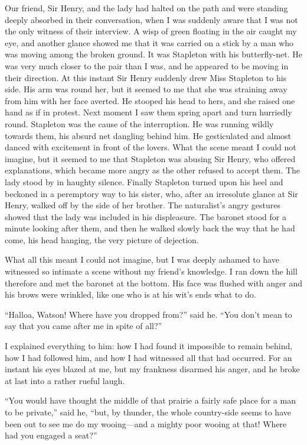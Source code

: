 \documentclass[paper=a5,BCOR=7mm,twoside,DIV=calc,12pt,usegeometry,openany,chapterprefix,endperiod,headings=big]{scrbook} %
\begin{document}
Our friend, Sir Henry, and the lady had halted on the path and were standing deeply absorbed in their conversation, when I was suddenly aware that I was not the only witness of their interview. A wisp of green floating in the air caught my eye, and another glance showed me that it was carried on a stick by a man who was moving among the broken ground. It was Stapleton with his butterfly-net. He was very much closer to the pair than I was, and he appeared to be moving in their direction. At this instant Sir Henry suddenly drew Miss Stapleton to his side. His arm was round her, but it seemed to me that she was straining away from him with her face averted. He stooped his head to hers, and she raised one hand as if in protest. Next moment I saw them spring apart and turn hurriedly round. Stapleton was the cause of the interruption. He was running wildly towards them, his absurd net dangling behind him. He gesticulated and almost danced with excitement in front of the lovers. What the scene meant I could not imagine, but it seemed to me that Stapleton was abusing Sir Henry, who offered explanations, which became more angry as the other refused to accept them. The lady stood by in haughty silence. Finally Stapleton turned upon his heel and beckoned in a peremptory way to his sister, who, after an irresolute glance at Sir Henry, walked off by the side of her brother. The naturalist's angry gestures showed that the lady was included in his displeasure. The baronet stood for a minute looking after them, and then he walked slowly back the way that he had come, his head hanging, the very picture of dejection.

What all this meant I could not imagine, but I was deeply a\-shamed to have witnessed so intimate a scene without my friend's knowledge. I ran down the hill therefore and met the baronet at the bottom. His face was flushed with anger and his brows were wrin\-kled, like one who is at his wit's ends what to do.

\enquote{Halloa, Watson! Where have you dropped from?} said he. \enquote{You don't mean to say that you came after me in spite of all?}

I explained everything to him: how I had found it impossible to remain behind, how I had followed him, and how I had witnessed all that had occurred. For an instant his eyes blazed at me, but my frankness disarmed his anger, and he broke at last into a rather rueful laugh.

\enquote{You would have thought the middle of that prairie a fairly safe place for a man to be private,} said he, \enquote{but, by thunder, the whole country-side seems to have been out to see me do my wooing---and a mighty poor wooing at that! Where had you engaged a seat?}
\end{document}
